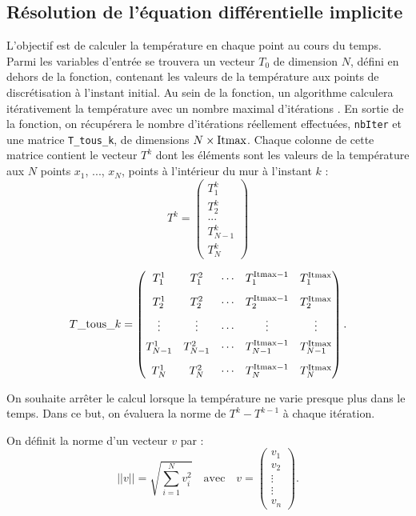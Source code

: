 \documentclass[10pt,fleqn]{article} %
\begin{document}
\begin{multicols}{2}
\section*{Résolution de l'équation différentielle implicite}
\ifprof
\else
L'objectif est de calculer la température en chaque point au cours du temps. Parmi les variables
d'entrée se trouvera un vecteur $T_0$ de dimension $N$, défini en dehors de la fonction,
 contenant les valeurs de la température aux points de discrétisation à l'instant initial. 
 Au sein de la fonction, un algorithme calculera itérativement la température avec un 
 nombre maximal d'itérations . En sortie de la fonction, on récupérera le nombre 
 d'itérations réellement effectuées, \texttt{nbIter} et une matrice \texttt{T\_tous\_k}, de
  dimensions $N\times \text{\text{Itmax}}$.  Chaque colonne de cette matrice contient le vecteur $T^k$
   dont les éléments sont les valeurs de la température aux $N$ points $x_1$, ..., $x_N$, 
 points à l'intérieur du mur à l'instant $k$ :
$$
T^k = \begin{pmatrix} T_1^k \\  T_2 ^k \\ ... \\  T_{N-1}^{k} \\ T_{N}^{k}  \end{pmatrix}
$$

$$
T\_\text{tous}\_k = 
\begin{pmatrix} 
T_1^1   & T_1^2  & \cdots & T_1^{\text{Itmax}-1} & T_{1}^{\text{Itmax}} \vspace{0.3cm} \\
T_2^1   & T_2^2  & \cdots & T_2^{\text{Itmax}-1} & T_2^{\text{Itmax} }  \vspace{0.15cm}\\
\vdots & \vdots & \cdots & \vdots & \vdots \vspace{0.15cm}\\
T_{N-1}^1   & T_{N-1}^2  & \cdots & T_{N-1}^{\text{Itmax}-1} & T_{N-1}^{\text{Itmax}} \vspace{0.3cm} \\
T_{N}^1   & T_{N}^2  & \cdots & T_{N}^{\text{Itmax}-1} & T_{N}^{\text{Itmax}}  \\
 \end{pmatrix}.
$$


On souhaite arrêter le calcul lorsque la température ne varie presque plus dans le temps. 
Dans ce but, on évaluera la norme  de $T^k - T^{k-1}$ à chaque itération. 
\begin{defi}
On définit la norme d'un vecteur $v$ par : 
$$
||v|| = \sqrt{\sum\limits_{i=1}^{N}v_i^2} \quad \text{avec} \quad v=
\begin{pmatrix} v_1 \\ v_2 \\ \vdots \\ \vdots \\ v_n \end{pmatrix}.
$$
\end{defi}


\end{multicols}
\end{document}
